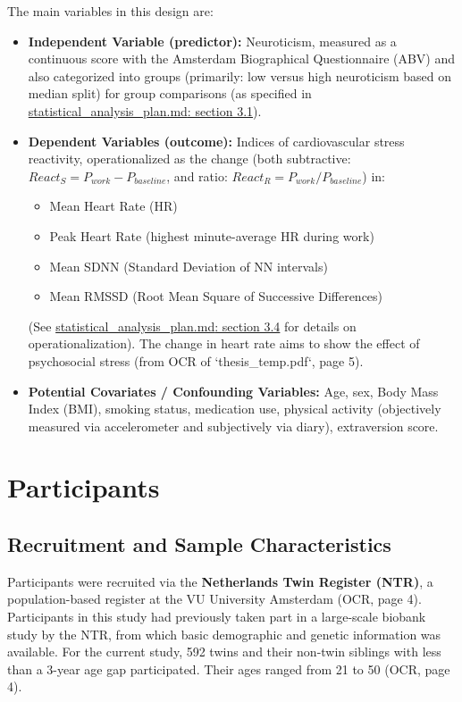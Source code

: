 \documentclass[11pt, a4paper]{report}
\newcommand{\mdcitesec}[2]{\href{run:./sources/#1}{\url{#1}: section #2}}
\begin{document}
The main variables in this design are:
\begin{itemize}
    \item \textbf{Independent Variable (predictor):} Neuroticism, measured as a continuous score with the Amsterdam Biographical Questionnaire (ABV) and also categorized into groups (primarily: low versus high neuroticism based on median split) for group comparisons (as specified in \mdcitesec{statistical_analysis_plan.md}{3.1}).
    \item \textbf{Dependent Variables (outcome):} Indices of cardiovascular stress reactivity, operationalized as the change (both subtractive: $React_S = P_{work} - P_{baseline}$, and ratio: $React_R = P_{work} / P_{baseline}$) in:
        \begin{itemize}
            \item Mean Heart Rate (HR)
            \item Peak Heart Rate (highest minute-average HR during work)
            \item Mean SDNN (Standard Deviation of NN intervals)
            \item Mean RMSSD (Root Mean Square of Successive Differences)
        \end{itemize}
    (See \mdcitesec{statistical_analysis_plan.md}{3.4} for details on operationalization). The change in heart rate aims to show the effect of psychosocial stress (from OCR of `thesis_temp.pdf`, page 5).
    \item \textbf{Potential Covariates / Confounding Variables:} Age, sex, Body Mass Index (BMI), smoking status, medication use, physical activity (objectively measured via accelerometer and subjectively via diary), extraversion score.
\end{itemize}

\section{Participants}
\label{sec:participants_method} %

\subsection{Recruitment and Sample Characteristics}
\label{subsec:recruitment} %
Participants were recruited via the \textbf{Netherlands Twin Register (NTR)}, a population-based register at the VU University Amsterdam \cite{ThesisTempPDF} (OCR, page 4). Participants in this study had previously taken part in a large-scale biobank study by the NTR, from which basic demographic and genetic information was available. For the current study, 592 twins and their non-twin siblings with less than a 3-year age gap participated. Their ages ranged from 21 to 50 \cite{ThesisTempPDF} (OCR, page 4).
\end{document}
